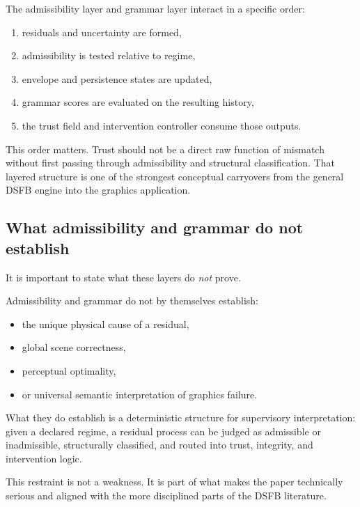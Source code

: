 \documentclass[11pt,letterpaper]{article}
\theoremstyle{gcresult}
\theoremstyle{definition}
\begin{document}
The admissibility layer and grammar layer interact in a specific order:

\begin{enumerate}[leftmargin=1.5em]
    \item residuals and uncertainty are formed,
    \item admissibility is tested relative to regime,
    \item envelope and persistence states are updated,
    \item grammar scores are evaluated on the resulting history,
    \item the trust field and intervention controller consume those outputs.
\end{enumerate}

This order matters. Trust should not be a direct raw function of mismatch without first passing through admissibility and structural classification. That layered structure is one of the strongest conceptual carryovers from the general DSFB engine into the graphics application.


\subsection{What admissibility and grammar do not establish}

It is important to state what these layers do \emph{not} prove.

Admissibility and grammar do not by themselves establish:
\begin{itemize}[leftmargin=1.5em]
    \item the unique physical cause of a residual,
    \item global scene correctness,
    \item perceptual optimality,
    \item or universal semantic interpretation of graphics failure.
\end{itemize}

What they do establish is a deterministic structure for supervisory interpretation: given a declared regime, a residual process can be judged as admissible or inadmissible, structurally classified, and routed into trust, integrity, and intervention logic.

This restraint is not a weakness. It is part of what makes the paper technically serious and aligned with the more disciplined parts of the DSFB literature. 
\end{document}
